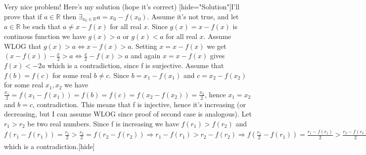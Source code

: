 \begin{solution}
	Very nice problem! Here's my solution (hope it's correct)
[hide="Solution"]I'll prove that if $ a\in \mathbb{R}$ then $ \exists_{x_0\in \mathbb{R}} a=x_0-f(x_0)$. Assume it's not true, and let $ a\in \mathbb{R}$ be such that $ a\neq x-f(x)$ for all real $ x$. Since $ g(x)=x-f(x)$ is continous function we have $ g(x)>a$ or $ g(x)<a$ for all real $ x$. Assume WLOG that $ g(x)>a\iff x-f(x)>a$. Setting $ x=x-f(x)$ we get $ (x-f(x))-\frac{x}{2}>a\iff \frac{x}{2}-f(x)>a$ and again $ x=x-f(x)$ gives $ f(x)<-2a$ which is a contradiction, since f is surjective. Assume that $ f(b)=f(c)$ for some real $ b\neq c$. Since $ b=x_1-f(x_1)$ and $ c=x_2-f(x_2)$ for some real $ x_1,x_2$ we have $ \frac{x_1}{2}=f(x_1-f(x_1))=f(b)=f(c)=f(x_2-f(x_2))=\frac{x_2}{2}$, hence $ x_1=x_2$ and $ b=c$, contradiction. This means that f is injective, hence it's increasing (or decreasing, but I can assume WLOG since proof of second case is analogous). Let $ r_1>r_2$ be two real numbers. Since f is increasing we have $ f(r_1)>f(r_2)$ and $ f(r_1-f(r_1))=\frac{r_1}{2}>\frac{r_2}{2}=f(r_2-f(r_2))\Rightarrow r_1-f(r_1)>r_2-f(r_2)\Rightarrow f(\frac{r_1}{2}-f(r_1))=\frac{r_1-f(r_1)}{2}>\frac{r_2-f(r_2)}{2}=f(\frac{r_2}{2}-f(r_2))\Rightarrow f(-\frac{f(r_1)}{2})=\frac{\frac{r_1}{2}-f(r_1)}{2}>\frac{\frac{r_2}{2}-f(r_2)}{2}=f(-\frac{f(r_2)}{2})\Rightarrow f(r_1)<f(r_2)$ which is a contradiction.[\/hide]
\end{solution}



